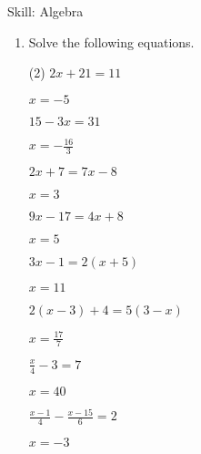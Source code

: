 \begin{bxTip}[colbacktitle=green]{Skill: Algebra}

\begin{enumerate} [leftmargin=0cm] 

\item Solve the following equations.
\begin{tasks}[label=(\alph*), after-item-skip=2pt,after-skip=3pt, label-width=4ex](2)
    \task  $ 2x+21=11                          $	           \begin{envAnswer}[blankline=2]    $      x=-5                    $ \end{envAnswer}
    \task  $ 15-3x=31                          $	           \begin{envAnswer}[blankline=2]    $      x=-\frac{16}{3}         $ \end{envAnswer}
	\task  $ 2x+7=7x-8                         $               \begin{envAnswer}[blankline=2]    $      x=3                     $ \end{envAnswer}
	\task  $ 9x-17=4x+8                        $               \begin{envAnswer}[blankline=2]    $      x=5                     $ \end{envAnswer}
    \task  $ 3x-1=2(x+5)                       $	           \begin{envAnswer}[blankline=3]    $      x=11                    $ \end{envAnswer}
	\task  $ 2(x-3)+4=5(3-x)                   $               \begin{envAnswer}[blankline=3]    $      x=\frac{17}{7}          $ \end{envAnswer}
    \task  $ \frac{x}{4} -3=7                  $	           \begin{envAnswer}[blankline=3]    $      x=40                    $ \end{envAnswer}
    \task  $ \frac{x-1}{4}-\frac{x-15}{6}=2    $               \begin{envAnswer}[blankline=3]    $      x=-3                    $ \end{envAnswer}
\end{tasks}


\end{enumerate}

\end{bxTip}



